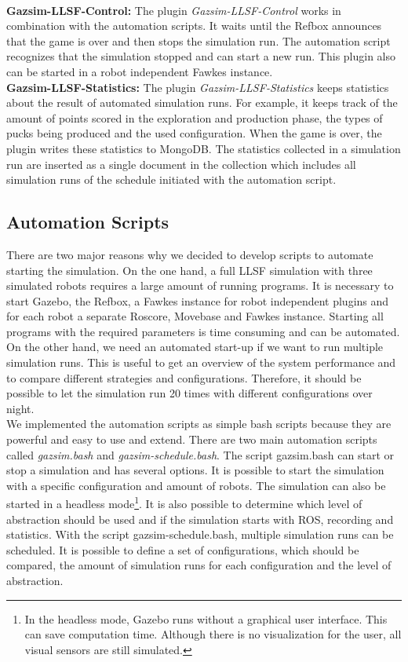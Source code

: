 \\
\textbf{Gazsim-LLSF-Control:}
The plugin \textit{Gazsim-LLSF-Control} works in combination with the automation scripts. It waits until the Refbox announces that the game is over and then stops the simulation run. The automation script recognizes that the simulation stopped and can start a new run. This plugin also can be started in a robot independent Fawkes instance.
\\
\textbf{Gazsim-LLSF-Statistics:}
The plugin \textit{Gazsim-LLSF-Statistics} keeps statistics about the result of automated simulation runs. For example, it keeps track of the amount of points scored in the exploration and production phase, the types of pucks being produced and the used configuration. When the game is over, the plugin writes these statistics to MongoDB. The statistics collected in a simulation run are inserted as a single document in the collection which includes all simulation runs of the schedule initiated with the automation script.



\subsection{Automation Scripts}
There are two major reasons why we decided to develop scripts to automate starting the simulation. On the one hand, a full LLSF simulation with three simulated robots requires a large amount of running programs. It is necessary to start Gazebo, the Refbox, a Fawkes instance for robot independent plugins and for each robot a separate Roscore, Movebase and Fawkes instance. Starting all programs with the required parameters is time consuming and can be automated. On the other hand, we need an automated start-up if we want to run multiple simulation runs. This is useful to get an overview of the system performance and to compare different strategies and configurations. Therefore, it should be possible to let the simulation run 20 times with different configurations over night.\\
We implemented the automation scripts as simple bash scripts because they are powerful and easy to use and extend. There are two main automation scripts called \textit{gazsim.bash} and \textit{gazsim-schedule.bash}. The script gazsim.bash can start or stop a simulation and has several options. It is possible to start the simulation with a specific configuration and amount of robots. The simulation can also be started in a headless mode\footnote{In the headless mode, Gazebo runs without a graphical user interface. This can save computation time. Although there is no visualization for the user, all visual sensors are still simulated.}. It is also possible to determine which level of abstraction should be used and if the simulation starts with ROS, recording and statistics. With the script gazsim-schedule.bash, multiple simulation runs can be scheduled. It is possible to define a set of configurations, which should be compared, the amount of simulation runs for each configuration and the level of abstraction.

